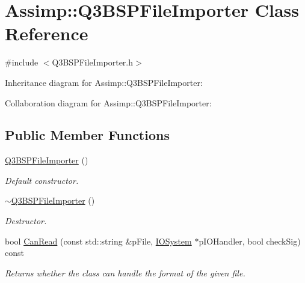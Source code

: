 \hypertarget{class_assimp_1_1_q3_b_s_p_file_importer}{\section{Assimp\+:\+:Q3\+B\+S\+P\+File\+Importer Class Reference}
\label{class_assimp_1_1_q3_b_s_p_file_importer}
}


{\ttfamily \#include $<$Q3\+B\+S\+P\+File\+Importer.\+h$>$}



Inheritance diagram for Assimp\+:\+:Q3\+B\+S\+P\+File\+Importer\+:


Collaboration diagram for Assimp\+:\+:Q3\+B\+S\+P\+File\+Importer\+:
\subsection*{Public Member Functions}
\begin{DoxyCompactItemize}
\item 
\hypertarget{class_assimp_1_1_q3_b_s_p_file_importer_aaab8ab2a1f1a69c9de83c909f232c8f3}{\hyperlink{class_assimp_1_1_q3_b_s_p_file_importer_aaab8ab2a1f1a69c9de83c909f232c8f3}{Q3\+B\+S\+P\+File\+Importer} ()}\label{class_assimp_1_1_q3_b_s_p_file_importer_aaab8ab2a1f1a69c9de83c909f232c8f3}

\begin{DoxyCompactList}\small\item\em Default constructor. \end{DoxyCompactList}\item 
\hypertarget{class_assimp_1_1_q3_b_s_p_file_importer_af2e16c443b2ca082583f35e23aa9395d}{\hyperlink{class_assimp_1_1_q3_b_s_p_file_importer_af2e16c443b2ca082583f35e23aa9395d}{$\sim$\+Q3\+B\+S\+P\+File\+Importer} ()}\label{class_assimp_1_1_q3_b_s_p_file_importer_af2e16c443b2ca082583f35e23aa9395d}

\begin{DoxyCompactList}\small\item\em Destructor. \end{DoxyCompactList}\item 
bool \hyperlink{class_assimp_1_1_q3_b_s_p_file_importer_a9c17059ed987592cf7189a698a11e17c}{Can\+Read} (const std\+::string \&p\+File, \hyperlink{class_assimp_1_1_i_o_system}{I\+O\+System} $\ast$p\+I\+O\+Handler, bool check\+Sig) const 
\begin{DoxyCompactList}\small\item\em Returns whether the class can handle the format of the given file. \end{DoxyCompactList}\end{DoxyCompactItemize}
